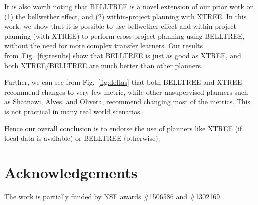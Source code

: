\documentclass[10pt, journal, compsoc]{IEEEtran}
\newcommand{\be}{\begin{enumerate}}
\newcommand{\ee}{\end{enumerate}}
\newcommand{\fig}[1]{Fig.~\ref{fig:#1}}
\begin{document}
It is also worth noting that BELLTREE is a novel extension of our prior work on (1) the bellwether effect, and (2) within-project planning with XTREE. In this work, we show that it is possible to use bellwether effect and within-project planning (with XTREE) to perform cross-project planning using BELLTREE, without the need for more complex transfer learners. Our results from~\fig{results} show that BELLTREE is just as good as XTREE, and both XTREE/BELLTREE are much better than other planners. 

Further, we can see from \fig{deltas} that both BELLTREE and XTREE recommend changes to very few metric, while other unsupervised planners such as Shatnawi, Alves, and Olivera, recommend changing most of the metrics. This is not practical in many real world scenarios.


Hence our overall conclusion is to endorse the use of planners like XTREE (if local data is available) or BELLTREE (otherwise).




\section*{Acknowledgements}
The work is partially funded by NSF awards \#1506586 and \#1302169.
\balance



\end{document}
